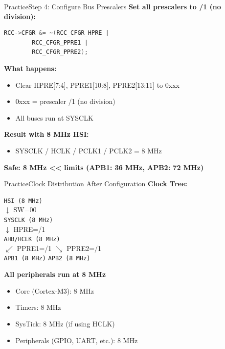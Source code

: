 \documentclass{beamer}
\begin{document}
\begin{frame}[fragile]{Practice}{Step 4: Configure Bus Prescalers}
	\textbf{Set all prescalers to /1 (no division):}
	\begin{lstlisting}[language=C, basicstyle=\ttfamily\small]
		RCC->CFGR &= ~(RCC_CFGR_HPRE | 
		RCC_CFGR_PPRE1 | 
		RCC_CFGR_PPRE2);
	\end{lstlisting}
	
	\medskip
	\textbf{What happens:}
	\begin{itemize}
		\item Clear HPRE[7:4], PPRE1[10:8], PPRE2[13:11] to 0xxx
		\item 0xxx = prescaler /1 (no division)
		\item All buses run at SYSCLK
	\end{itemize}
	
	\medskip
	\textbf{Result with 8 MHz HSI:}
	\begin{itemize}
		\item SYSCLK / HCLK / PCLK1 / PCLK2 = 8 MHz
	\end{itemize}
	
	\smallskip
	\textbf{Safe: 8 MHz << limits (APB1: 36 MHz, APB2: 72 MHz)}
\end{frame}

\begin{frame}{Practice}{Clock Distribution After Configuration}
	\textbf{Clock Tree:}
	\begin{center}
		\texttt{HSI (8 MHz)}\\
		$\downarrow$ SW=00\\
		\texttt{SYSCLK (8 MHz)}\\
		$\downarrow$ HPRE=/1\\
		\texttt{AHB/HCLK (8 MHz)}\\
		$\swarrow$ PPRE1=/1 \quad\quad $\searrow$ PPRE2=/1\\
		\texttt{APB1 (8 MHz)} \quad\quad \texttt{APB2 (8 MHz)}
	\end{center}
	
	\medskip
	\textbf{All peripherals run at 8 MHz}
	\begin{itemize}
		\item Core (Cortex-M3): 8 MHz
		\item Timers: 8 MHz\footnotemark
		\item SysTick: 8 MHz (if using HCLK)
		\item Peripherals (GPIO, UART, etc.): 8 MHz
	\end{itemize}
	
\end{frame}
\end{document}
